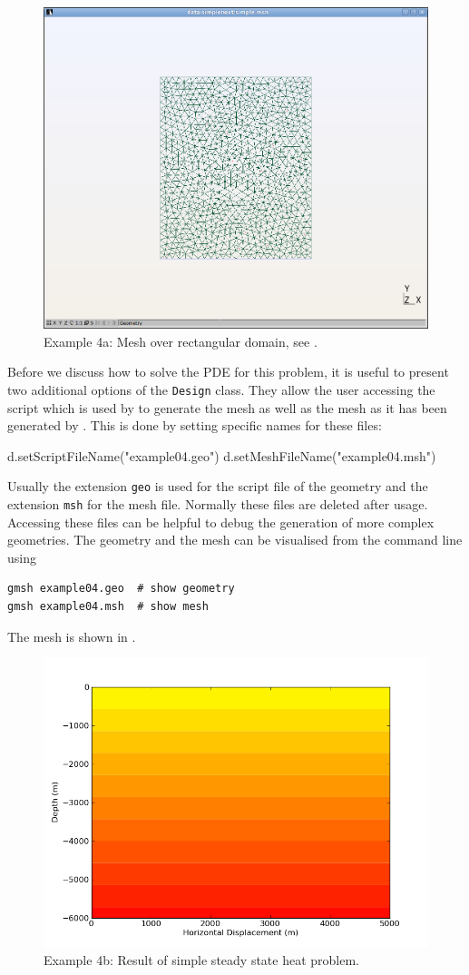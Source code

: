 \begin{figure}[ht]
\centerline{\includegraphics[width=4.in]{figures/simplemesh}}
\caption{Example 4a: Mesh over rectangular domain, see .}
\label{fig:pycad rec mesh}
\end{figure}

Before we discuss how to solve the PDE for this 
problem, it is useful to present two additional options of the \verb|Design| class. 
They allow the user accessing the script which is used by \gmsh to generate the mesh as well as
the mesh as it has been generated by \gmsh. This is done by setting specific names for these files: 
\begin{python}
d.setScriptFileName("example04.geo")
d.setMeshFileName("example04.msh")
\end{python}
Usually the extension \texttt{geo} is used for the script file of the \gmsh geometry and
the extension \texttt{msh} for the mesh file. Normally these files are deleted after usage. 
Accessing these files can be helpful to debug the generation of more complex geometries. The geometry and the mesh can be visualised from the command line using
\begin{verbatim}
gmsh example04.geo  # show geometry
gmsh example04.msh  # show mesh
\end{verbatim}
The mesh is shown in .
\begin{figure}[ht]
\centerline{\includegraphics[width=4.in]{figures/simpleheat}}
\caption{Example 4b: Result of simple steady state heat problem.}
\label{fig:steady state heat}
\end{figure}



